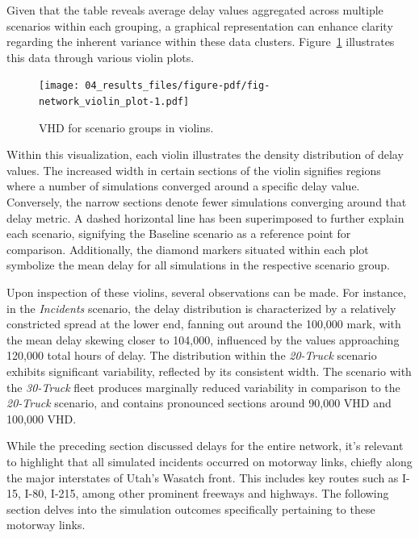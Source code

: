 \documentclass[fancy, oneside, mastersfancy, ms]{byuthesis}
\begin{document}
Given that the table reveals average delay values aggregated across
multiple scenarios within each grouping, a graphical representation can
enhance clarity regarding the inherent variance within these data
clusters. Figure~\ref{fig-network_violin_plot} illustrates this data
through various violin plots.

\begin{figure}

{\centering \texttt{[image: 04\_results\_files/figure-pdf/fig-network\_violin\_plot-1.pdf]}

}

\caption{\label{fig-network_violin_plot}VHD for scenario groups in
violins.}

\end{figure}

Within this visualization, each violin illustrates the density
distribution of delay values. The increased width in certain sections of
the violin signifies regions where a number of simulations converged
around a specific delay value. Conversely, the narrow sections denote
fewer simulations converging around that delay metric. A dashed
horizontal line has been superimposed to further explain each scenario,
signifying the Baseline scenario as a reference point for comparison.
Additionally, the diamond markers situated within each plot symbolize
the mean delay for all simulations in the respective scenario group.

Upon inspection of these violins, several observations can be made. For
instance, in the \emph{Incidents} scenario, the delay distribution is
characterized by a relatively constricted spread at the lower end,
fanning out around the 100,000 mark, with the mean delay skewing closer
to 104,000, influenced by the values approaching 120,000 total hours of
delay. The distribution within the \emph{20-Truck} scenario exhibits
significant variability, reflected by its consistent width. The scenario
with the \emph{30-Truck} fleet produces marginally reduced variability
in comparison to the \emph{20-Truck} scenario, and contains pronounced
sections around 90,000 VHD and 100,000 VHD.

While the preceding section discussed delays for the entire network,
it's relevant to highlight that all simulated incidents occurred on
motorway links, chiefly along the major interstates of Utah's Wasatch
front. This includes key routes such as I-15, I-80, I-215, among other
prominent freeways and highways. The following section delves into the
simulation outcomes specifically pertaining to these motorway links.
\end{document}
